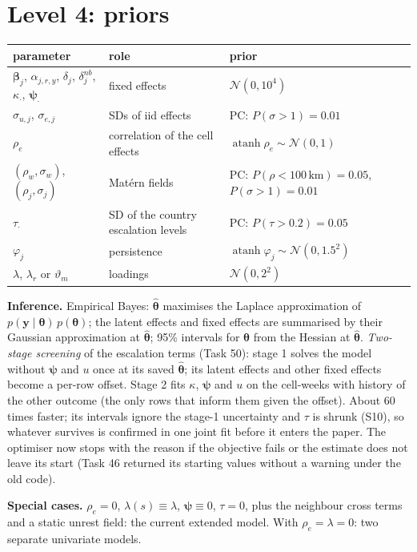 \documentclass[10pt]{article}
\newcommand{\N}{\mathcal{N}}
\begin{document}
\section*{Level 4: priors}
{\small\begin{tabular}{@{}lll@{}}
\toprule
parameter & role & prior \\
\midrule
$\bm\beta_j$, $\alpha_{j,r,y}$, $\delta_j$, $\delta^{nb}_j$, $\kappa_{\cdot}$, $\bm\psi_{\cdot}$ & fixed effects & $\N(0, 10^4)$ \\
$\sigma_{u,j}$, $\sigma_{e,j}$ & SDs of iid effects & PC: $P(\sigma > 1) = 0.01$ \\
$\rho_e$ & correlation of the cell effects & $\operatorname{atanh}\rho_e \sim \N(0, 1)$ \\
$(\rho_w, \sigma_w)$, $(\rho_j, \sigma_j)$ & Mat\'ern fields & PC: $P(\rho < 100\,\mathrm{km}) = 0.05$, $P(\sigma > 1) = 0.01$ \\
$\tau_{\cdot}$ & SD of the country escalation levels & PC: $P(\tau > 0.2) = 0.05$ \\
$\varphi_j$ & persistence & $\operatorname{atanh}\varphi_j \sim \N(0, 1.5^2)$ \\
$\lambda$, $\lambda_r$ or $\vartheta_m$ & loadings & $\N(0, 2^2)$ \\
\bottomrule
\end{tabular}}

\textbf{Inference.} Empirical Bayes: $\hat{\bm\theta}$ maximises the Laplace approximation of
$p(\bm y \mid \bm\theta)\, p(\bm\theta)$; the latent effects and fixed effects are summarised by their
Gaussian approximation at $\hat{\bm\theta}$; 95\% intervals for $\bm\theta$ from the Hessian at
$\hat{\bm\theta}$.
\emph{Two-stage screening} of the escalation terms (Task 50): stage 1 solves the model without $\bm\psi$ and $u$
once at its saved $\hat{\bm\theta}$; its latent effects and other fixed effects become a per-row offset. Stage 2 fits
$\kappa$, $\bm\psi$ and $u$ on the cell-weeks with history of the other outcome (the only rows that inform them
given the offset). About 60 times faster; its intervals ignore the stage-1 uncertainty and $\tau$ is shrunk (S10),
so whatever survives is confirmed in one joint fit before it enters the paper.
The optimiser now stops with the reason if the objective fails or the estimate does not leave its start (Task 46
returned its starting values without a warning under the old code).

\textbf{Special cases.} $\rho_e = 0$, $\lambda(s) \equiv \lambda$, $\bm\psi \equiv 0$, $\tau = 0$, plus the neighbour cross
terms and a static unrest field: the current extended model. With $\rho_e = \lambda = 0$: two separate
univariate models.
\end{document}
